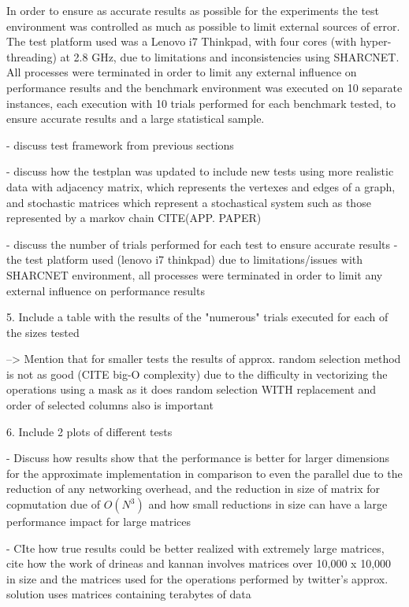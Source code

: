 \documentclass[oneside]{article}
\begin{document}
In order to ensure as accurate results as possible for the experiments the test environment was controlled as much as possible to limit external sources of error. The test platform used was a Lenovo i7 Thinkpad, with four cores (with hyper-threading) at 2.8 GHz, due to limitations and inconsistencies using SHARCNET. All processes were terminated in order to limit any external influence on performance results and the benchmark environment was executed on 10 separate instances, each execution with 10 trials performed for each benchmark tested, to ensure accurate results and a large statistical sample.

- discuss test framework from previous sections

- discuss how the testplan was updated to include new tests using more realistic data with adjacency matrix, which represents the vertexes and edges of a graph, and stochastic matrices which represent a stochastical
system such as those represented by a markov chain CITE(APP. PAPER)

- discuss the number of trials performed for each test to ensure accurate results
- the test platform used (lenovo i7 thinkpad) due to limitations/issues with SHARCNET environment, all processes were terminated in order to limit any external influence on performance results



5. Include a table with the results of the "numerous" trials executed for each of the sizes tested

    --> Mention that for smaller tests the results of approx. random selection method is not as good (CITE big-O complexity) due to the difficulty in vectorizing the operations using a mask as it does random selection WITH replacement and order of selected columns also is important


6. Include 2 plots of different tests

- Discuss how results show that the performance is better for larger dimensions for the approximate implementation in comparison to even the parallel due to the reduction of any networking overhead, and
the reduction in size of matrix for copmutation due of $O(N^{3})$ and how small reductions in size can have
a large performance impact for large matrices

- CIte how true results could be better realized with extremely large matrices, cite how the work of drineas and kannan involves matrices over 10,000 x 10,000 in size and the matrices used for the operations performed by twitter's approx. solution uses matrices containing terabytes of data
\end{document}
